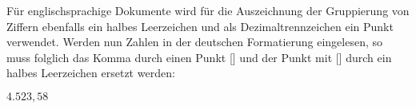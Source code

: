\documentclass[english,ngerman]{tudscrartcl}
\begin{document}
\begin{Bundle}{}
\begin{Trunk*}
\end{Trunk*}
%
Für englischsprachige Dokumente wird für die Auszeichnung der Gruppierung von 
Ziffern ebenfalls ein halbes Leerzeichen und als Dezimaltrennzeichen ein Punkt 
verwendet. Werden nun Zahlen in der deutschen Formatierung eingelesen, so muss 
folglich das Komma durch einen Punkt [] und der 
Punkt mit [\PParameter{\Macro*{,}}] durch ein halbes Leerzeichen 
ersetzt werden:%
%
\begin{Trunk*}
\begingroup
  \dotswap{\,}
  \(4.523,58\)
\endgroup
\end{Trunk*}
%
\FinishTutorial
\ListOfToDo
\end{Bundle}
\end{document}
